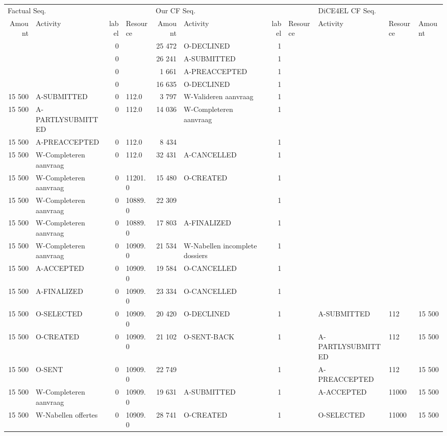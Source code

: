 \begin{tabular}{rlrlrlrllll}
\toprule
\multicolumn{4}{l}{Factual Seq.} & \multicolumn{4}{l}{Our CF Seq.} & \multicolumn{3}{l}{DiCE4EL CF Seq.} \\
Amount & Activity & label & Resource & Amount & Activity & label & Resource & Activity & Resource & Amount \\
\midrule
 &  & 0 &  & 25 472 & O-DECLINED & 1 &  &  &  &  \\
 &  & 0 &  & 26 241 & A-SUBMITTED & 1 &  &  &  &  \\
 &  & 0 &  & 1 661 & A-PREACCEPTED & 1 &  &  &  &  \\
 &  & 0 &  & 16 635 & O-DECLINED & 1 &  &  &  &  \\
15 500 & A-SUBMITTED & 0 & 112.0 & 3 797 & W-Valideren aanvraag & 1 &  &  &  &  \\
15 500 & A-PARTLYSUBMITTED & 0 & 112.0 & 14 036 & W-Completeren aanvraag & 1 &  &  &  &  \\
15 500 & A-PREACCEPTED & 0 & 112.0 & 8 434 &  & 1 &  &  &  &  \\
15 500 & W-Completeren aanvraag & 0 & 112.0 & 32 431 & A-CANCELLED & 1 &  &  &  &  \\
15 500 & W-Completeren aanvraag & 0 & 11201.0 & 15 480 & O-CREATED & 1 &  &  &  &  \\
15 500 & W-Completeren aanvraag & 0 & 10889.0 & 22 309 &  & 1 &  &  &  &  \\
15 500 & W-Completeren aanvraag & 0 & 10889.0 & 17 803 & A-FINALIZED & 1 &  &  &  &  \\
15 500 & W-Completeren aanvraag & 0 & 10909.0 & 21 534 & W-Nabellen incomplete dossiers & 1 &  &  &  &  \\
15 500 & A-ACCEPTED & 0 & 10909.0 & 19 584 & O-CANCELLED & 1 &  &  &  &  \\
15 500 & A-FINALIZED & 0 & 10909.0 & 23 334 & O-CANCELLED & 1 &  &  &  &  \\
15 500 & O-SELECTED & 0 & 10909.0 & 20 420 & O-DECLINED & 1 &  & A-SUBMITTED & 112 & 15 500 \\
15 500 & O-CREATED & 0 & 10909.0 & 21 102 & O-SENT-BACK & 1 &  & A-PARTLYSUBMITTED & 112 & 15 500 \\
15 500 & O-SENT & 0 & 10909.0 & 22 749 &  & 1 &  & A-PREACCEPTED & 112 & 15 500 \\
15 500 & W-Completeren aanvraag & 0 & 10909.0 & 19 631 & A-SUBMITTED & 1 &  & A-ACCEPTED & 11000 & 15 500 \\
15 500 & W-Nabellen offertes & 0 & 10909.0 & 28 741 & O-CREATED & 1 &  & O-SELECTED & 11000 & 15 500 \\

\end{tabular}
